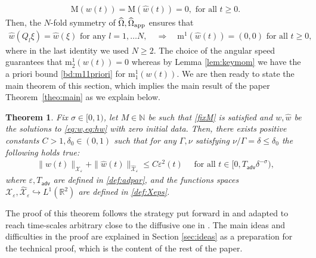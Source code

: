 \documentclass[11pt,reqno,a4paper]{amsart}
\def\eps{\varepsilon}
\def\RR {\mathbb{R}}
\def\NN {\mathbb{N}}
\newcommand{\cX}{\mathcal{X}}
\newcommand{\adv}{\mathsf{adv}}
\newcommand{\mrm}{\mathrm{m}}
\newcommand{\mrM}{\mathrm{M}}
\newcommand{\1}{\mathbbm{1}}
\newtheorem{theorem}[proposition]{Theorem}
\theoremstyle{definition}
\theoremstyle{definition}
\numberwithin{equation}{section}
\begin{document}
\begin{align}
    \mrM(w(t))=\mrM(\widehat{w}(t))=0, \text{ for all } t\geq0.
\end{align}
 Then, the $N$-fold symmetry of $\widehat{\Omega},\widehat{\Omega}_{\rm app}$ ensures that
\begin{align}
\label{momhw}
    \widehat{w}(Q_l\xi)=\widehat{w}(\xi) \text{ for any } l=1,\dots N,\quad \Longrightarrow\quad 
    \mrm^1(\widehat{w}(t))=(0,0) \text{ for all } t\geq0,
\end{align}
where in the last identity we used  $N\geq 2$. The choice of the angular speed  guarantees that $\mrm^1_2(w(t))=0$ whereas by Lemma \ref{lem:keymom} we have the a priori bound \cref{bd:m11priori} for  $\mrm_1^1(w(t))$. 
We are then ready to state the main theorem of this section, which implies the main result of the paper Theorem~\ref{theo:main} as we explain below.
\begin{theorem}
\label{th:mainNL}
    Fix $\sigma\in [0,1)$, let $M\in \NN$ be such that \cref{fixM} is satisfied and $w,\widehat{w}$ be the solutions to \cref{eq:w,eq:hw} with zero initial data. Then, there exists positive constants $C>1,\delta_0\in (0,1)$ such that for any $\Gamma,\nu$ satisfying  $\nu/\Gamma=\delta\leq \delta_0$ the following holds true:
    \begin{align}
    \label{bd:mainNLbd}
\|w(t)\|_{\cX_\eps}+\|\widehat{w}(t)\|_{\widehat{\cX}_\eps}\leq C\eps^2(t)\quad \text{ for all } t\in[0,T_{\adv}\delta^{-\sigma}),
    \end{align}
    where $\eps,T_{\adv}$ are defined in \cref{def:adpar},  and the functions spaces $\cX_{\eps},\widehat{\cX}_{\eps}\hookrightarrow L^1(\RR^2)$ are defined in \cref{def:Xeps}. 
\end{theorem}
The proof of this theorem follows the strategy put forward in \cite{GaSring} and adapted to reach time-scales arbitrary close to the diffusive one in \cite{dolce2024long}. The main ideas and difficulties in the proof are explained in Section \ref{sec:ideas} as a preparation for the technical proof, which is the content of the rest of the paper.
\end{document}
